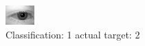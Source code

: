 \begin{figure}[h!]
\begin{center}
\includegraphics[width=0.60\columnwidth]{figures/ID502_class_1_target_2.png}
\end{center}
\caption{ Classification: 1 actual target: 2}
\label{fig:ID502_class_1_target_2}
\end{figure}

